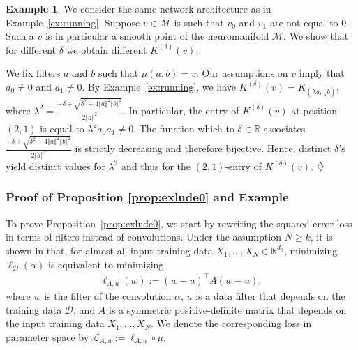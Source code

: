 \documentclass[twoside]{article}
\theoremstyle{definition}
\newtheorem{example}[theorem]{Example}
\theoremstyle{remark}
\begin{document}
\begin{example}\label{ex:varyingDelta}
We consider the same network architecture as in Example~\ref{ex:running}.
Suppose $v \in \mathcal{M}$ is such that $v_0$ and $v_1$ are not equal to 0. 
Such a $v$ is in particular a smooth point of the neuromanifold $\mathcal{M}$.
We show that for different $\delta$ we obtain different $K^{(\delta)}(v)$.

We fix filters $a$ and $b$ such that  $\mu(a,b) = v$. 
Our assumptions on $v$ imply that $a_0 \neq 0$ and $a_1 \neq 0$. 
By Example~\ref{ex:running}, 
we have $K^{(\delta)}(v) = K_{(\lambda a, \frac{1}{\lambda} b)}$, 
where 
$\lambda^2 = \frac{-\delta + \sqrt{\delta^2+4\Vert a \Vert^2 \Vert b \Vert^2}}{2\Vert a \Vert^2 }$. 
In particular, the entry of $K^{(\delta)}(v)$ at position $(2,1)$ is equal to $\lambda^2 a_0 a_1 \neq 0$.
The function which to $\delta \in \mathbb{R}$ associates $\frac{-\delta + \sqrt{\delta^2+4\Vert a \Vert^2 \Vert b \Vert^2}}{2\Vert a \Vert^2 }$ is strictly decreasing and therefore bijective.
Hence, distinct  $\delta$'s yield distinct values for $\lambda^2$ and thus for the $(2,1)$-entry of $K^{(\delta)}(v)$.
$\hfill \diamondsuit$
\end{example}




\subsubsection{Proof of Proposition \ref{prop:exlude0} and Example}

To prove Proposition~\ref{prop:exlude0}, we start by rewriting the squared-error loss in terms of filters instead of  convolutions.
Under the assumption $N \geq k$, it is shown in \cite[Corollary~7.2]{kohn2024function}
that, for almost all input training data $X_1, \ldots, X_N \in \mathbb{R}^{d_0}$, 
minimizing $\ell_\mathcal{D}(\alpha)$ is equivalent to minimizing
\begin{align*}
    \ell_{A,u}(w) := (w-u)^\top A (w-u),
\end{align*}
where $w$ is the filter of the convolution $\alpha$, 
$u$ is a data filter that depends on the training data $\mathcal{D}$,
and $A$ is a symmetric positive-definite matrix that depends on the input training data $X_1,\ldots,X_N$.
We denote the corresponding loss in parameter space by $\mathcal{L}_{A,u} := \ell_{A,u} \circ \mu$.
\end{document}
